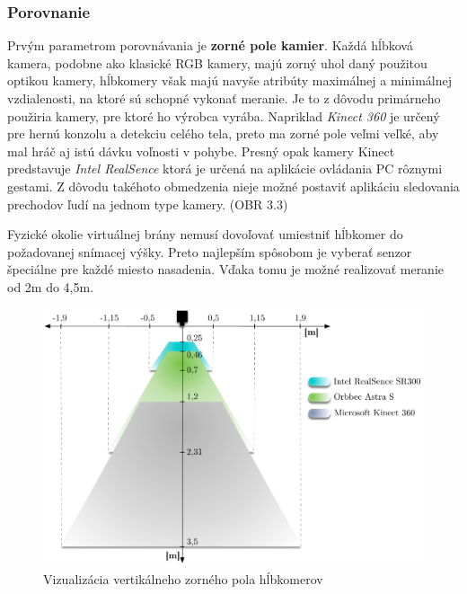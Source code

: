\subsubsection{Porovnanie}
Prvým parametrom porovnávania je \textbf{zorné pole kamier}. Každá hĺbková kamera, podobne ako klasické RGB kamery, majú zorný uhol daný použitou optikou kamery, hĺbkomery však majú navyše atribúty maximálnej a minimálnej vzdialenosti, na ktoré sú schopné vykonať meranie. Je to z dôvodu primárneho použiria kamery, pre ktoré ho výrobca vyrába. Napriklad \textit{Kinect 360} je určený pre hernú konzolu a detekciu celého tela, preto ma zorné pole veľmi veľké, aby mal hráč aj istú dávku voľnosti v pohybe. Presný opak kamery Kinect predstavuje \textit{Intel RealSence} ktorá je určená na aplikácie ovládania PC rôznymi gestami. Z dôvodu takéhoto obmedzenia nieje možné postaviť aplikáciu sledovania prechodov ľudí na jednom type kamery. (OBR 3.3) 

Fyzické okolie virtuálnej brány nemusí dovoľovať umiestniť hĺbkomer do požadovanej snímacej výšky. Preto najlepším spôsobom je vyberať senzor špeciálne pre každé miesto nasadenia. Vďaka tomu je možné realizovať meranie od 2m do 4,5m.

\begin{figure}[H]
\begin{center}
	\includegraphics[scale=0.7]{obrazky/camerasViews}
	\caption{Vizualizácia vertikálneho zorného pola hĺbkomerov}
	\end{center}
\end{figure}
























